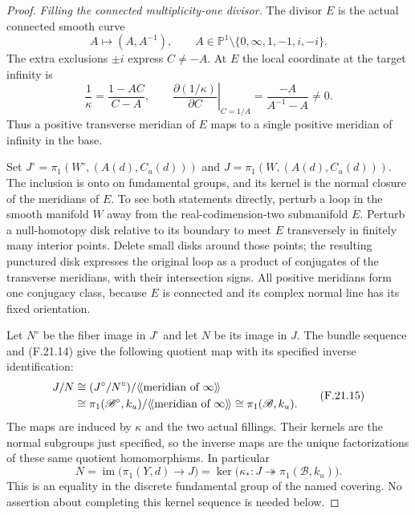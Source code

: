 \begin{proof}
\emph{Filling the connected multiplicity-one divisor.}
The divisor $E$ is the actual connected smooth curve
\[
 A\longmapsto(A,A^{-1}),\qquad
 A\in\mathbb P^1\setminus\{0,\infty,1,-1,i,-i\}.
                                                               \tag{F.21.13}
\]
The extra exclusions $\pm i$ express $C\ne-A$.
At $E$ the local coordinate at the target infinity is
\[
 \frac1\kappa=\frac{1-AC}{C-A},\qquad
 \left.\frac{\partial(1/\kappa)}{\partial C}\right|_{C=1/A}
       =\frac{-A}{A^{-1}-A}\ne0.
                                                               \tag{F.21.14}
\]
Thus a positive transverse meridian of $E$ maps to
a single positive meridian of infinity in the base.

Set $J^\circ=\pi_1(W^\circ,(A(d),C_u(d)))$ and
$J=\pi_1(W,(A(d),C_u(d)))$. The inclusion is onto
on fundamental groups, and its kernel is the normal
closure of the meridians of $E$. To see both statements
directly, perturb a loop in the smooth manifold $W$
away from the real-codimension-two submanifold $E$.
Perturb a null-homotopy disk relative to its boundary
to meet $E$ transversely in finitely many interior
points. Delete small disks around those points;
the resulting punctured disk expresses the original
loop as a product of conjugates of the transverse
meridians, with their intersection signs.
All positive meridians form one conjugacy class,
because $E$ is connected and its complex normal line
has its fixed orientation.

Let $N^\circ$ be the fiber image in $J^\circ$ and let
$N$ be its image in $J$. The bundle sequence and
(F.21.14) give the following quotient map with its
specified inverse identification:
\[
 \begin{aligned}
 J/N
 &\cong
 (J^\circ/N^\circ)/
       \langle\!\langle\hbox{meridian of }\infty
                                \rangle\!\rangle\\
 &\cong
 \pi_1(\mathscr B^\circ,k_u)/
       \langle\!\langle\hbox{meridian of }\infty
                                \rangle\!\rangle
 \cong\pi_1(\mathscr B,k_u).
 \end{aligned}                                                \tag{F.21.15}
\]
The maps are induced by $\kappa$ and the two actual
fillings. Their kernels are the normal subgroups
just specified, so the inverse maps are the unique
factorizations of these same quotient homomorphisms.
In particular
\[
 N=\operatorname{im}\bigl(\pi_1(Y,d)\to J\bigr)
      =\ker\bigl(\kappa_*:J\twoheadrightarrow
                                  \pi_1(\mathscr B,k_u)\bigr).
                                                               \tag{F.21.16}
\]
This is an equality in the discrete fundamental group
of the named covering. No assertion about completing
this kernel sequence is needed below.


\end{proof}
